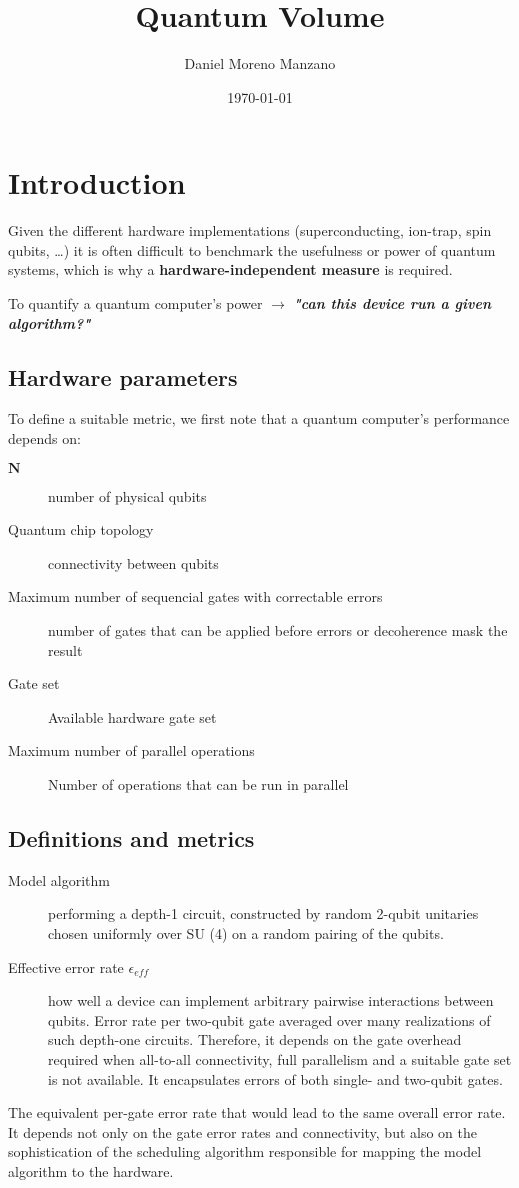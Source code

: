\documentclass[11pt]{article}
\author{Daniel Moreno Manzano}
\date{\today}
\title{Quantum Volume}
\begin{document}
\maketitle


\section{Introduction}
\label{sec:org33cd2bb}

Given the different hardware implementations (superconducting, ion-trap, spin qubits, \ldots{}) it is often difficult to benchmark the usefulness or power of quantum systems, which is why a \textbf{hardware-independent measure} is required.

To quantify a quantum computer's power \(\to\) \emph{\textbf{"can this device run a given algorithm?"}}

\subsection{Hardware parameters}
\label{sec:org0063b64}

To define a suitable metric, we first note that a quantum computer's performance depends on:

\begin{description}
\item[{\(\textbf{N}\)}] number of physical qubits
\item[{Quantum chip topology}] connectivity between qubits
\item[{Maximum number of sequencial gates with correctable errors}] number of gates that can be applied before errors or decoherence mask the result
\item[{Gate set}] Available hardware gate set
\item[{Maximum number of parallel operations}] Number of operations that can be run in parallel
\end{description}

\subsection{Definitions and metrics}
\label{sec:org359b8b0}

\begin{description}
\item[{Model algorithm}] performing a depth-1 circuit, constructed by random 2-qubit unitaries chosen uniformly over SU (4) on a random pairing of the qubits.
\item[{Effective error rate \(\epsilon_{eff}\)}] how well a device can implement arbitrary pairwise interactions between qubits. Error rate per two-qubit gate averaged over many realizations of such depth-one circuits. Therefore, it depends on the gate overhead required when all-to-all connectivity, full parallelism and a suitable gate set is not available. It encapsulates errors of both single- and two-qubit gates.
\end{description}
The equivalent per-gate error rate that would lead to the same overall error rate. It depends not only on the gate error rates and connectivity, but also on the sophistication of the scheduling algorithm responsible for mapping the model algorithm to the hardware.
\end{document}
